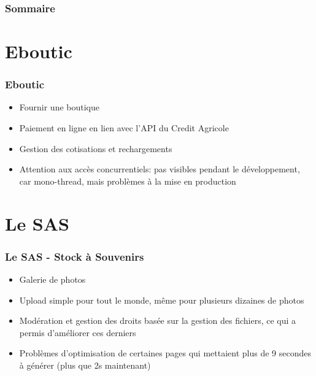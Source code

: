 \documentclass[10pt]{beamer}
\begin{document}

\begin{frame}
    \frametitle{Sommaire}
    \tableofcontents
\end{frame}

\section{Eboutic}
\begin{frame}[fragile]\frametitle{Eboutic}
    \begin{itemize}
        \item Fournir une boutique
        \item Paiement en ligne en lien avec l'API du Credit Agricole
        \item Gestion des cotisations et rechargements
        \item Attention aux accès concurrentiels: pas visibles pendant le développement, car mono-thread, mais problèmes
            à la mise en production
    \end{itemize}
\end{frame}

\section{Le SAS}
\label{sec:le_sas}
\begin{frame}[fragile]\frametitle{Le SAS - Stock à Souvenirs}
    \begin{itemize}
        \item Galerie de photos
        \item Upload simple pour tout le monde, même pour plusieurs dizaines de photos
        \item Modération et gestion des droits basée sur la gestion des fichiers, ce qui a permis d'améliorer ces
            derniers
        \item Problèmes d'optimisation de certaines pages qui mettaient plus de 9 secondes à générer (plus que 2s
            maintenant)
    \end{itemize}
\end{frame}
\end{document}
